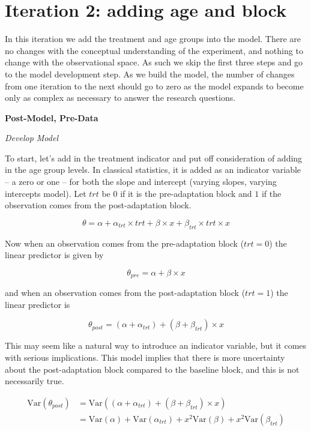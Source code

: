 \documentclass[11pt, oneside, openany]{scrbook}
\begin{document}
\hypertarget{iter2}{%
\section{Iteration 2: adding age and block}\label{iter2}}

In this iteration we add the treatment and age groups into the model. There are no changes with the conceptual understanding of the experiment, and nothing to change with the observational space. As such we skip the first three steps and go to the model development step. As we build the model, the number of changes from one iteration to the next should go to zero as the model expands to become only as complex as necessary to answer the research questions.

\textbf{Post-Model, Pre-Data}

\emph{Develop Model}

To start, let's add in the treatment indicator and put off consideration of adding in the age group levels. In classical statistics, it is added as an indicator variable -- a zero or one -- for both the slope and intercept (varying slopes, varying intercepts model). Let \(trt\) be \(0\) if it is the pre-adaptation block and \(1\) if the observation comes from the post-adaptation block.


\[\theta = \alpha + \alpha_{trt} \times trt + \beta \times x + \beta_{trt}\times trt \times x\]

Now when an observation comes from the pre-adaptation block (\(trt=0\)) the linear predictor is given by


\[\theta_{pre} = \alpha + \beta \times x\]

and when an observation comes from the post-adaptation block (\(trt=1\)) the linear predictor is


\[\theta_{post} = (\alpha + \alpha_{trt}) + (\beta + \beta_{trt}) \times x\]

This may seem like a natural way to introduce an indicator variable, but it comes with serious implications. This model implies that there is more uncertainty about the post-adaptation block compared to the baseline block, and this is not necessarily true.


\begin{align*}
\mathrm{Var}(\theta_{post}) &= \mathrm{Var}((\alpha + \alpha_{trt}) + (\beta + \beta_{trt}) \times x) \\
&= \mathrm{Var}(\alpha) + \mathrm{Var}(\alpha_{trt}) + x^2 \mathrm{Var}(\beta) + x^2\mathrm{Var}(\beta_{trt})
\end{align*}
\end{document}

